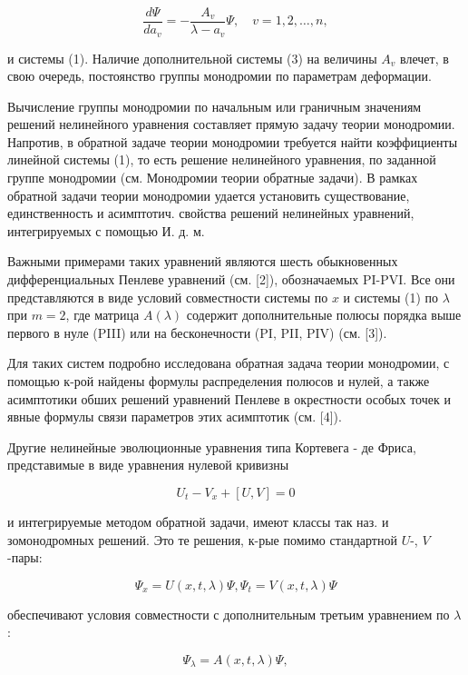 \documentclass[10pt]{article}
\begin{document}
\[

\frac{d \Psi}{d a_{v}}=-\frac{A_{v}}{\lambda-a_{v}} \Psi, \quad v=1,2, \ldots, n,

\]



и системы (1). Наличие дополнительной системы (3) на величины $A_{v}$ влечет, в свою очередь, постоянство группы монодромии по параметрам деформации.



Вычисление группы монодромии по начальным или граничным значениям решений нелинейного уравнения составляет прямую задачу теории монодромии. Напротив, в обратной задаче теории монодромии требуется найти коэффициенты линейной системы (1), то есть решение нелинейного уравнения, по заданной группе монодромии (см. Монодромии теории обратные задачи). В рамках обратной задачи теории монодромии удается установить существование, единственность и асимптотич. свойства решений нелинейных уравнений, интегрируемых с помощью И. д. м.



Важными примерами таких уравнений являются шесть обыкновенных дифференциальных Пенлеве уравнений (см. [2]), обозначаемых PI-PVI. Все они представляются в виде условий совместности системы по $x$ и системы (1) по $\lambda$ при $m=2$, где матрица $A(\lambda)$ содержит дополнительные полюсы порядка выше первого в нуле (PIII) или на бесконечности (PI, PII, PIV) (см. [3]).



Для таких систем подробно исследована обратная задача теории монодромии, с помощью к-рой найдены формулы распределения полюсов и нулей, а также асимптотики обших решений уравнений Пенлеве в окрестности особых точек и явные формулы связи параметров этих асимптотик (см. [4]).



Другие нелинейные эволюционные уравнения типа Кортевега - де Фриса, представимые в виде уравнения нулевой кривизны



\[

U_{t}-V_{x}+[U, V]=0

\]



и интегрируемые методом обратной задачи, имеют классы так наз. и зомонодромных решений. Это те решения, к-рые помимо стандартной $U$-, $V$-пары:



\[

\Psi_{x}=U(x, t, \lambda) \Psi, \Psi_{t}=V(x, t, \lambda) \Psi

\]



обеспечивают условия совместности с дополнительным третьим уравнением по $\lambda$ :



\[

\Psi_{\lambda}=A(x, t, \lambda) \Psi,

\]
\end{document}
